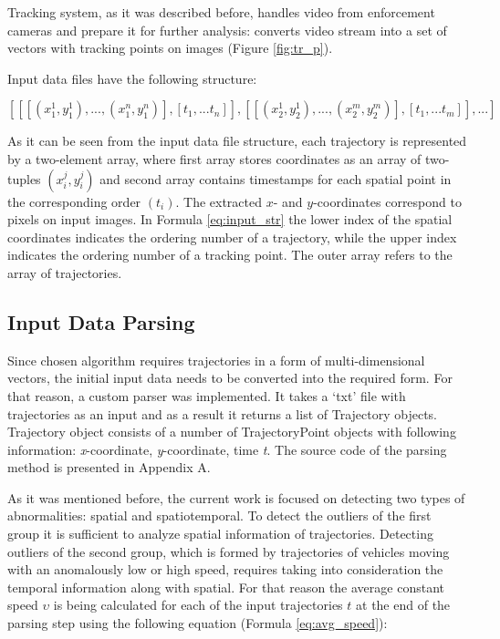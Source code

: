 Tracking system, as it was described before, handles video from enforcement cameras and prepare it for further analysis: converts video stream into a set of vectors with tracking points on images (Figure \ref{fig:tr_p}).

Input data files have the following structure:

\begin{equation} \label{eq:input_str}
	[[[(x_1^1, y_1^1), ..., (x_1^n, y_1^n)], [t_1, ... t_n]], [[(x_2^1, y_2^1), ..., (x_2^m, y_2^m)], [t_1, ... t_m]], ...]
\end{equation}

As it can be seen from the input data file structure, each trajectory is represented by a two-element array, where first array stores coordinates as an array of two-tuples $(x_i^j, y_i^j)$ and second array contains timestamps for each spatial point in the corresponding order $(t_i)$. The extracted $x$- and $y$-coordinates correspond to pixels on input images. In Formula \ref{eq:input_str} the lower index of the spatial coordinates indicates the ordering number of a trajectory, while the upper index indicates the ordering number of a tracking point. The outer array refers to the array of trajectories.

\subsection{Input Data Parsing}

Since chosen algorithm requires trajectories in a form of multi-dimensional vectors, the initial input data needs to be converted into the required form. For that reason, a custom parser was implemented. It takes a ‘txt’ file with trajectories as an input and as a result it returns a list of Trajectory objects. Trajectory object consists of a number of TrajectoryPoint objects with following information: \textit{x}-coordinate, \textit{y}-coordinate, time \textit{t}. The source code of the parsing method is presented in Appendix A.

As it was mentioned before, the current work is focused on detecting two types of abnormalities: spatial and spatiotemporal. To detect the outliers of the first group it is sufficient to analyze spatial information of trajectories. Detecting outliers of the second group, which is formed by trajectories of vehicles moving with an anomalously low or high speed, requires taking into consideration the temporal information along with spatial. For that reason the average constant speed $\upsilon$ is being calculated for each of the input trajectories $t$ at the end of the parsing step using the following equation (Formula \ref{eq:avg_speed}):

